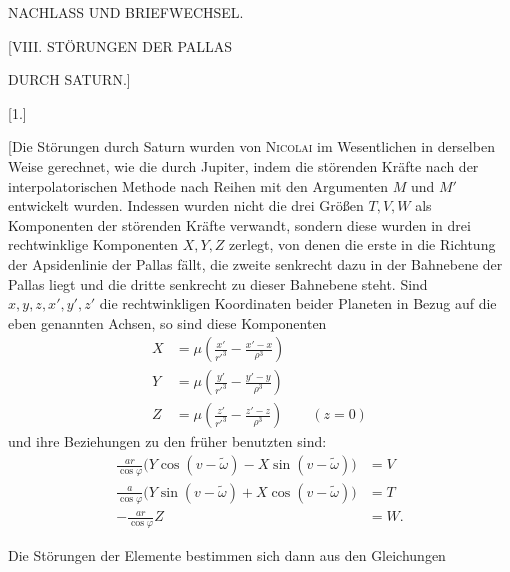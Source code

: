 \clearpage
\begingroup
{}
\renewcommand{\headrulewidth}{0pt}
\clearpage
{}
\begin{center}
\large NACHLASS UND BRIEFWECHSEL.
\par\bigskip
\Large [VIII. STÖRUNGEN DER PALLAS\par DURCH SATURN.]
\par\bigskip
\normalsize [1.]
\end{center}
\begingroup
\small
\makeatletter\tagsleft@true\let\veqno\@@leqno\makeatother
\par\noindent\hspace*{\parindent}[Die Störungen durch Saturn wurden von \textsc{Nicolai} im Wesentlichen in derselben Weise
gerechnet, wie die durch Jupiter, indem die störenden Kräfte nach der interpolatorischen
Methode nach Reihen mit den Argumenten \(M\) und \(M'\) entwickelt wurden. Indessen wurden nicht
die drei Größen \(T,V,W\) als Komponenten der störenden Kräfte verwandt, sondern diese
wurden in drei rechtwinklige Komponenten \(X,Y,Z\) zerlegt, von denen die erste in die
Richtung der Apsidenlinie der Pallas fällt, die zweite senkrecht dazu in der Bahnebene der
Pallas liegt und die dritte senkrecht zu dieser Bahnebene steht. Sind \(x,y,z,x',y',z'\)
die rechtwinkligen Koordinaten beider Planeten in Bezug auf die eben genannten Achsen, so sind
diese Komponenten
\[
\tag*{1)}
\begin{aligned}
X&=\mu\left(\frac{x'}{r'^3}-\frac{x'-x}{\rho^3}\right)\\[.6em]
Y&=\mu\left(\frac{y'}{r'^3}-\frac{y'-y}{\rho^3}\right)\\[.6em]
Z&=\mu\left(\frac{z'}{r'^3}-\frac{z'-z}{\rho^3}\right)\qquad(z=0)
\end{aligned}
\]
und ihre Beziehungen zu den früher benutzten sind:
\[
\begin{aligned}
\frac{ar}{\cos\varphi}\bigl(Y\cos(v-\tilde\omega)-X\sin(v-\tilde\omega)\bigr)&=V\\[.6em]
\frac{a}{\cos\varphi}\bigl(Y\sin(v-\tilde\omega)+X\cos(v-\tilde\omega)\bigr)&=T\\[.6em]
-\frac{ar}{\cos\varphi}Z&=W.
\end{aligned}
\]
\par\noindent\hspace*{\parindent}Die Störungen der Elemente bestimmen sich dann aus den Gleichungen

